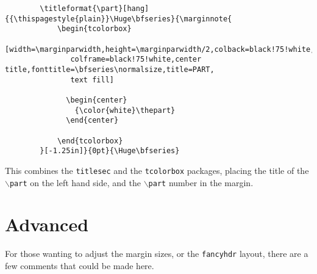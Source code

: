\documentclass[10pt]{article}
\begin{document}
	\begin{fullpage}
	\begin{verbatim}
		\titleformat{\part}[hang]{{\thispagestyle{plain}}\Huge\bfseries}{\marginnote{
			\begin{tcolorbox}
			[width=\marginparwidth,height=\marginparwidth/2,colback=black!75!white,
			   colframe=black!75!white,center title,fonttitle=\bfseries\normalsize,title=PART,
			   text fill]

			  \begin{center}
			  	{\color{white}\thepart}
			  \end{center}

			\end{tcolorbox}
		}[-1.25in]}{0pt}{\Huge\bfseries}
	\end{verbatim}
	\end{fullpage}
	
	This combines the \texttt{titlesec} and the \texttt{tcolorbox} packages, placing the title of the \texttt{$\backslash$part} on the left hand side, and the \texttt{$\backslash$part} number in the margin.
	

	\part{Advanced}
	For those wanting to adjust the margin sizes, or the \texttt{fancyhdr} layout, there are a few comments that could be made here.
\end{document}
